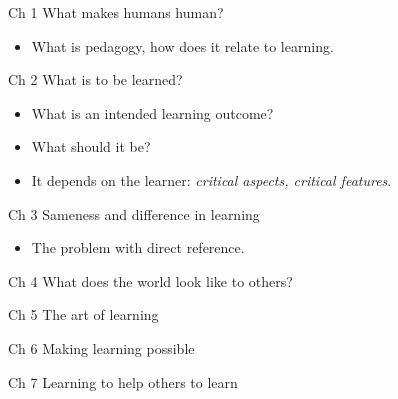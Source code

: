 \begin{frame}
  \begin{block}{Ch 1 What makes humans human?}
    \begin{itemize}
      \item What is pedagogy, how does it relate to learning.
    \end{itemize}
  \end{block}
\end{frame}

\begin{frame}
  \begin{block}{Ch 2 What is to be learned?}
    \begin{itemize}
      \item What is an intended learning outcome?
      \item What should it be?
      \item It depends on the learner: \emph{critical aspects, critical 
        features}.
    \end{itemize}
  \end{block}
\end{frame}

\begin{frame}
  \begin{block}{Ch 3 Sameness and difference in learning}
    \begin{itemize}
      \item The problem with direct reference.
    \end{itemize}
  \end{block}
\end{frame}

\begin{frame}
  \begin{block}{Ch 4 What does the world look like to others?}
  \end{block}
\end{frame}

\begin{frame}
  \begin{block}{Ch 5 The art of learning}
  \end{block}
\end{frame}

\begin{frame}
  \begin{block}{Ch 6 Making learning possible}
  \end{block}
\end{frame}

\begin{frame}
  \begin{block}{Ch 7 Learning to help others to learn}
  \end{block}
\end{frame}
